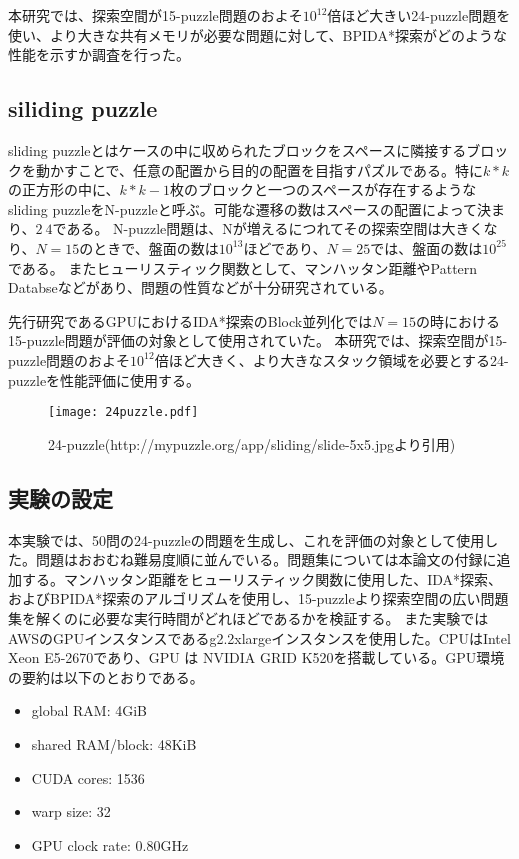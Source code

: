 \documentclass[a4paper,11pt,oneside,openany]{jsbook}
\begin{document}
本研究では、探索空間が15-puzzle問題のおよそ$10^12$倍ほど大きい24-puzzle問題を使い、より大きな共有メモリが必要な問題に対して、BPIDA*探索がどのような性能を示すか調査を行った。


\subsection{siliding puzzle}
sliding puzzleとはケースの中に収められたブロックをスペースに隣接するブロックを動かすことで、任意の配置から目的の配置を目指すパズルである。特に$k * k$の正方形の中に、$ k * k - 1$枚のブロックと一つのスペースが存在するようなsliding puzzleをN-puzzleと呼ぶ。可能な遷移の数はスペースの配置によって決まり、$2~4$である。
N-puzzle問題は、Nが増えるにつれてその探索空間は大きくなり、$N=15$のときで、盤面の数は$10^13$ほどであり、$N=25$では、盤面の数は$10^25$である。
またヒューリスティック関数として、マンハッタン距離やPattern Databseなどがあり、問題の性質などが十分研究されている。

先行研究であるGPUにおけるIDA*探索のBlock並列化\cite{HA17}では$N=15$の時における15-puzzle問題が評価の対象として使用されていた。
本研究では、探索空間が15-puzzle問題のおよそ$10^12$倍ほど大きく、より大きなスタック領域を必要とする24-puzzleを性能評価に使用する。
\begin{figure}[htbp]
\begin{center}
\texttt{[image: 24puzzle.pdf]}
\caption{24-puzzle(http://mypuzzle.org/app/sliding/slide-5x5.jpgより引用)}
\end{center}
\end{figure}


\subsection{実験の設定}
本実験では、50問の24-puzzleの問題を生成し、これを評価の対象として使用した。問題はおおむね難易度順に並んでいる。問題集については本論文の付録に追加する。マンハッタン距離をヒューリスティック関数に使用した、IDA*探索、およびBPIDA*探索\cite{HA17}のアルゴリズムを使用し、15-puzzleより探索空間の広い問題集を解くのに必要な実行時間がどれほどであるかを検証する。
また実験ではAWSのGPUインスタンスであるg2.2xlargeインスタンスを使用した。CPUはIntel Xeon E5-2670であり、GPU
は NVIDIA GRID K520を搭載している。GPU環境の要約は以下のとおりである。
\begin{itemize}
 \item global RAM: 4GiB
 \item shared RAM/block: 48KiB
 \item CUDA cores: 1536
 \item warp size: 32
 \item GPU clock rate: 0.80GHz
\end{itemize}
\end{document}

